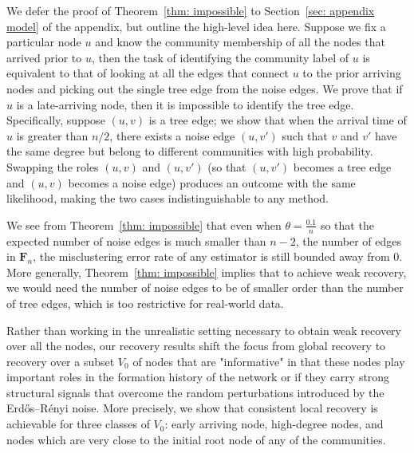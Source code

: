 \documentclass[twoside,11pt]{article}
\theoremstyle{remark}
\begin{document}
We defer the proof of Theorem~\ref{thm: impossible} to Section~\ref{sec: appendix model} of the appendix, but outline the high-level idea here. Suppose we fix a particular node $u$ and know the community membership of all the nodes that arrived prior to $u$, then the task of identifying the community label of $u$ is equivalent to that of looking at all the edges that connect $u$ to the prior arriving nodes and picking out the single tree edge from the noise edges. We prove that if $u$ is a late-arriving node, then it is impossible to identify the tree edge. Specifically, suppose $(u, v)$ is a tree edge; we show that when the arrival time of $u$ is greater than $n/2$, there exists a noise edge $(u, v')$ such that $v$ and $v'$ have the same degree but belong to different communities with high probability. Swapping the roles $(u, v)$ and $(u, v')$ (so that $(u, v')$ becomes a tree edge and $(u, v)$ becomes a noise edge) produces an outcome with the same likelihood, making the two cases indistinguishable to any method. 

We see from Theorem~\ref{thm: impossible} that even when $\theta = \frac{0.1}{n}$ so that the expected number of noise edges is much smaller than $n-2$, the number of edges in $\bm{F}_n$, the misclustering error rate of any estimator is still bounded away from 0. More generally, Theorem~\ref{thm: impossible} implies that to achieve weak recovery, we would need the number of noise edges to be of smaller order than the number of tree edges, which is too restrictive for real-world data. 

Rather than working in the unrealistic setting necessary to obtain weak recovery over all the nodes, our recovery results shift the focus from global recovery to recovery over a subset $V_0$ of nodes that are "informative" in that these nodes play important roles in the formation history of the network or if they carry strong structural signals that overcome the random perturbations introduced by the Erd\H{o}s--R\'enyi noise. More precisely, we show that consistent local recovery is achievable for three classes of $V_0$: early arriving node, high-degree nodes, and nodes which are very close to the initial root node of any of the communities.  

\end{document}
